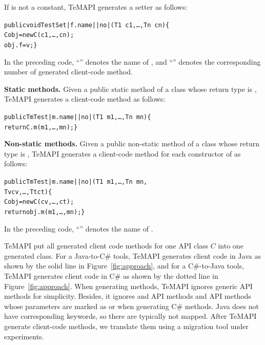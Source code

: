 If  is not a constant, TeMAPI generates a setter as follows:
\begin{CodeOut}%
\begin{alltt}
 public void TestSet|f.name||no|(T1\ c1,\ldots, Tn\ cn)\{
   C obj = new C(c1,\ldots, cn);
   obj.f = v; \}
\end{alltt}
\end{CodeOut}

In the preceding code, ``'' denotes the name of , and ``'' denotes the corresponding number of generated client-code method.

\textbf{Static methods.} Given a public static method  of a class  whose return type is , TeMAPI generates a client-code method as follows:
\begin{CodeOut}%
\begin{alltt}
 public Tm Test|m.name||no|(T1\ m1,\ldots, Tn\ mn)\{
   return C.m(m1,\ldots, mn); \}
\end{alltt}
\end{CodeOut}

\textbf{Non-static methods.} Given a public non-static method  of a class  whose return type is , TeMAPI generates a client-code method for each constructor  of  as follows:
\begin{CodeOut}%
\begin{alltt}
 public Tm Test|m.name||no|(T1\ m1,\ldots, Tn\ mn,
                            Tv cv, \ldots, Tt ct)\{
   C obj = new C(cv,\ldots, ct);
   return obj.m(m1,\ldots, mn); \}
\end{alltt}
\end{CodeOut}

In the preceding code, ``'' denotes the name of .

TeMAPI put all generated client code methods for one API class $C$ into one generated class. For a Java-to-C\# tools, TeMAPI generates client code in Java as shown by the solid line in Figure~\ref{fig:approach}, and for a C\#-to-Java tools, TeMAPI generates client code in C\# as shown by the dotted line in Figure~\ref{fig:approach}. When generating methods, TeMAPI ignores generic API methods for simplicity. Besides, it ignores  and  API methods and API methods whose parameters are marked as  or  when generating C\# methods. Java does not have corresponding keywords, so there are typically not mapped. After TeMAPI generate client-code methods, we translate them using a migration tool under experiments.

